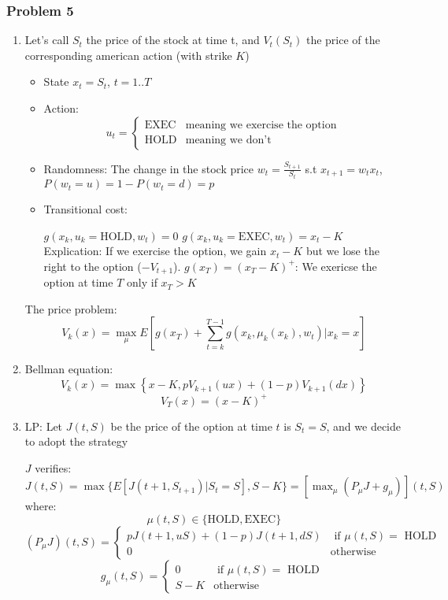\documentclass[12pt]{article}
\newcommand{\Q}[1]{\subsubsection*{Problem #1}}
\begin{document}
\Q{5}
\begin{enumerate}
\item Let's call $S_t$ the price of the stock at time t, and $V_t(S_t)$ the
  price of the corresponding american action (with strike $K$)
  \begin{itemize}
  \item State $x_t = S_t$, $t = 1..T$
  \item Action:
    \[
      u_t = \left\{ \begin{array}{cc}
                      \text{EXEC} & \text{meaning we exercise the option}\\
                      \text{HOLD} & \text{meaning we don't}
                    \end{array}
                  \right.
                \]
              \item Randomness: The change in the stock price
                $w_t = \frac{S_{t+1}}{S_t}$ s.t $x_{t+1} = w_t x_t$, $P(w_t = u) = 1 - P(w_t = d) = p$
              \item Transitional cost:
  
                $g(x_k, u_k=\text{HOLD}, w_t) = 0$
                $g(x_k, u_k=\text{EXEC}, w_t) = x_t-K$
                Explication: If we exercise the option, we gain
                $x_t-K$ but we lose the right to the option
                ($-V_{t+1}$).
                $g(x_T) = (x_T - K)^+$: We exericse the option at time $T$ only if $x_T > K$
              \end{itemize}
              The price problem:
  $$V_k(x) = \max_{\mu} E[g(x_T) + \sum_{t=k}^{T-1} g(x_k, \mu_k(x_k), w_t) | x_k = x]$$

\item Bellman equation:
  $$V_k(x) = \max \left\{ x-K , p V_{k+1}(u x) + (1-p) V_{k+1}(d x) \right\}$$
  $$V_T(x) = (x-K)^+$$

\item
  
  LP:
  Let $J(t, S)$ be the price of the option at time $t$ is $S_t = S$,
  and we decide to adopt the strategy 

  $J$ verifies: $J(t, S) = \max \{ E[J(t+1, S_{t+1}) | S_t = S], S - K \} = [\max_{\mu} (P_{\mu}J + g_\mu) ](t,S) $
  where:
  $$\mu(t, S) \in \{ \text{HOLD}, \text{EXEC} \}$$
  \[ (P_\mu J)(t, S) = \left\{
      \begin{array}{cc}
        p J(t+1, uS) + (1-p)J(t+1, dS) & \text{ if $\mu(t, S) = $ HOLD } \\
        0 & \text{otherwise}
      \end{array}
    \right.
  \]
  \[
    g_\mu(t, S) = \left\{
      \begin{array}{cc}
        0 & \text{ if $\mu(t, S) = $ HOLD } \\
        S - K & \text{otherwise}
      \end{array}
    \right.
  \]


\end{enumerate}
\end{document}

